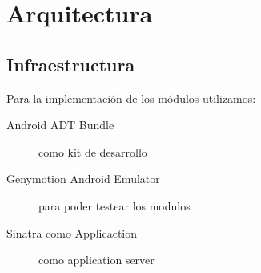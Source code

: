 \section{Arquitectura}
\subsection{Infraestructura}
Para la implementaci\'on de los m\'odulos utilizamos:

\begin{description}
    \item[Android ADT Bundle] como kit de desarrollo
    \item[Genymotion Android Emulator ] para poder testear los modulos
    \item[Sinatra como Applicaction ] como application server
\end{description}
